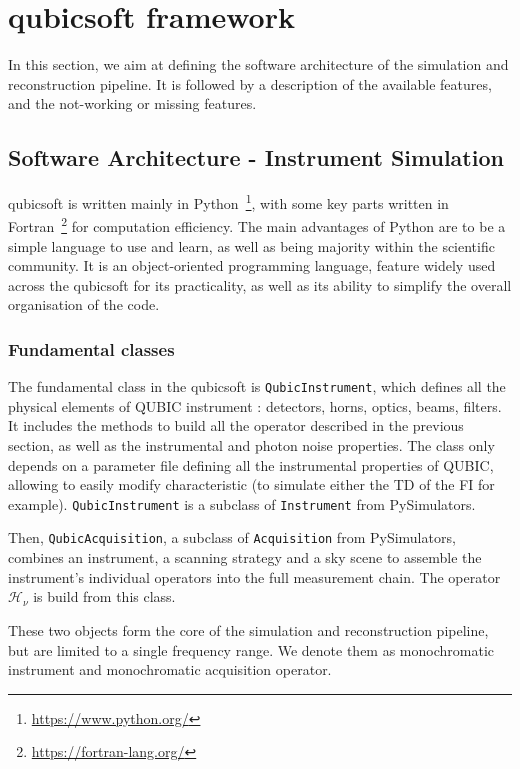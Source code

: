 \documentclass[../../thesis.tex]{subfiles}
\begin{document}
\section{qubicsoft framework}

In this section, we aim at defining the software architecture of the simulation and reconstruction pipeline. It is followed by a description of the available features, and the not-working or missing features.

\subsection{Software Architecture - Instrument Simulation}

qubicsoft is written mainly in Python~\footnote{\url{https://www.python.org/}}, with some key parts written in Fortran~\footnote{\url{https://fortran-lang.org/}} for computation efficiency. The main advantages of Python are to be a simple language to use and learn, as well as being majority within the scientific community. It is an object-oriented programming language, feature widely used across the qubicsoft for its practicality, as well as its ability to simplify the overall organisation of the code.

\subsubsection{Fundamental classes}

The fundamental class in the qubicsoft is \texttt{QubicInstrument}, which defines all the physical elements of QUBIC instrument : detectors, horns, optics, beams, filters. It includes the methods to build all the operator described in the previous section, as well as the instrumental and photon noise properties. The class only depends on a parameter file defining all the instrumental properties of QUBIC, allowing to easily modify characteristic (to simulate either the TD of the FI for example). \texttt{QubicInstrument} is a subclass of \texttt{Instrument} from PySimulators.

Then, \texttt{QubicAcquisition}, a subclass of \texttt{Acquisition} from PySimulators, combines an instrument, a scanning strategy and a sky scene to assemble the instrument's individual operators into the full measurement chain. The operator $\mathcal{H_\nu}$ is build from this class.

These two objects form the core of the simulation and reconstruction pipeline, but are limited to a single frequency range. We denote them as monochromatic instrument and monochromatic acquisition operator.
\end{document}
